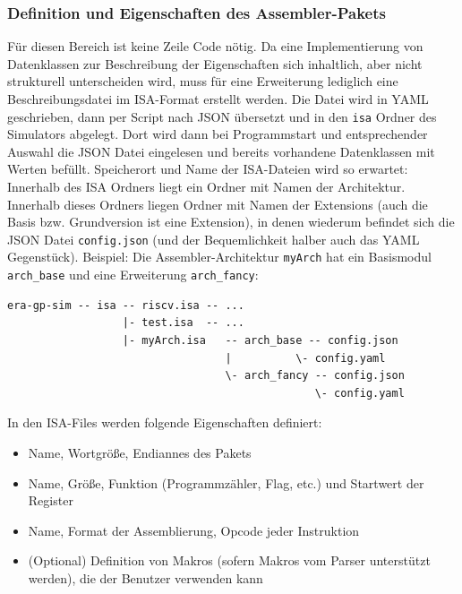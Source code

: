 \subsubsection{Definition und Eigenschaften des Assembler-Pakets}
Für diesen Bereich ist keine Zeile Code nötig. Da eine Implementierung von Datenklassen zur Beschreibung der Eigenschaften sich inhaltlich, aber nicht strukturell unterscheiden wird, muss für eine Erweiterung lediglich eine Beschreibungsdatei im ISA-Format erstellt werden. Die Datei wird in YAML geschrieben, dann per Script nach JSON übersetzt und in den \texttt{isa} Ordner des Simulators abgelegt. Dort wird dann bei Programmstart und entsprechender Auswahl die JSON Datei eingelesen und bereits vorhandene Datenklassen mit Werten befüllt. Speicherort und Name der ISA-Dateien wird so erwartet: Innerhalb des ISA Ordners liegt ein Ordner mit Namen der Architektur. Innerhalb dieses Ordners liegen Ordner mit Namen der Extensions (auch die Basis bzw. Grundversion ist eine Extension), in denen wiederum befindet sich die JSON Datei \texttt{config.json} (und der Bequemlichkeit halber auch das YAML Gegenstück). Beispiel: Die Assembler-Architektur \texttt{myArch} hat ein Basismodul \texttt{arch\_base} und eine Erweiterung \texttt{arch\_fancy}:
\begin{lstlisting}
era-gp-sim -- isa -- riscv.isa -- ...
                  |- test.isa  -- ...
                  |- myArch.isa   -- arch_base -- config.json
                                  |          \- config.yaml
                                  \- arch_fancy -- config.json
                                                \- config.yaml
\end{lstlisting}
In den ISA-Files werden folgende Eigenschaften definiert:
\begin{itemize}
	\item Name, Wortgröße, Endiannes des Pakets
	\item Name, Größe, Funktion (Programmzähler, Flag, etc.) und Startwert der Register
	\item Name, Format der Assemblierung, Opcode jeder Instruktion
	\item (Optional) Definition von Makros (sofern Makros vom Parser unterstützt werden), die der Benutzer verwenden kann
\end{itemize}

